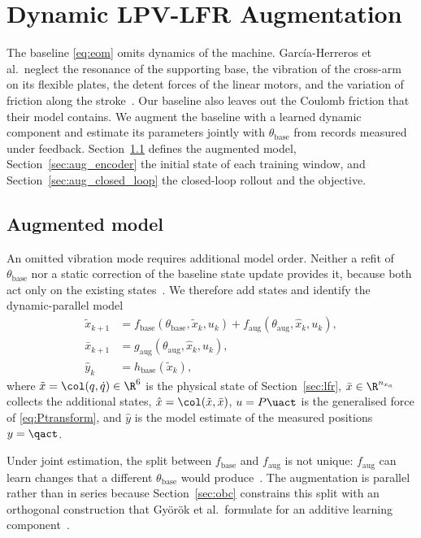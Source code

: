 \section{Dynamic LPV-LFR Augmentation}\label{sec:augmentation}

The baseline \eqref{eq:eom} omits dynamics of the machine.
Garc\'ia-Herreros et al.\ neglect the resonance of the supporting base, the
vibration of the cross-arm on its flexible plates, the detent forces of the
linear motors, and the variation of friction along the
stroke~\cite[Sec.~2.4]{garcia2013model}.
Our baseline also leaves out the Coulomb friction that their model contains.
We augment the baseline with a learned dynamic component and estimate its
parameters jointly with $\theta_{\mathrm{base}}$ from records measured under
feedback.
Section~\ref{sec:aug_structure} defines the augmented model,
Section~\ref{sec:aug_encoder} the initial state of each training window, and
Section~\ref{sec:aug_closed_loop} the closed-loop rollout and the objective.

\subsection{Augmented model}\label{sec:aug_structure}
An omitted vibration mode requires additional model order.
Neither a refit of $\theta_{\mathrm{base}}$ nor a static correction of the
baseline state update provides it, because both act only on the existing
states~\cite[Sec.~2]{hoekstra2025lfr}.
We therefore add states and identify the dynamic-parallel
model~\cite[Table~1]{hoekstra2026lfr}
\begin{equation}
\begin{aligned}
 \tilde x_{k+1}
 &=f_{\mathrm{base}}(\theta_{\mathrm{base}},\tilde x_k,u_k)
   +f_{\mathrm{aug}}(\theta_{\mathrm{aug}},\hat x_k,u_k),\\
 \bar x_{k+1}
 &=g_{\mathrm{aug}}(\theta_{\mathrm{aug}},\hat x_k,u_k),\\
 \hat y_k&=h_{\mathrm{base}}(\tilde x_k),
\end{aligned}
\label{eq:aug_transition}
\end{equation}
where $\tilde x=\col(q,\dot q)\in\R^6$ is the physical state of
Section~\ref{sec:lfr}, $\bar x\in\R^{n_{x_a}}$ collects the additional
states, $\hat x=\col(\tilde x,\bar x)$, $u=P\uact$ is the generalised force
of \eqref{eq:Ptransform}, and $\hat y$ is the model estimate of the measured
positions $y=\qact$.

Under joint estimation, the split between $f_{\mathrm{base}}$ and
$f_{\mathrm{aug}}$ is not unique: $f_{\mathrm{aug}}$ can learn changes that a
different $\theta_{\mathrm{base}}$ would
produce~\cite[Sec.~5.2]{hoekstra2026lfr}.
The augmentation is parallel rather than in series because
Section~\ref{sec:obc} constrains this split with an orthogonal construction
that Gy\"or\"ok et al.\ formulate for an additive learning
component~\cite[Sec.~2]{gyorok2025l4dc}.

